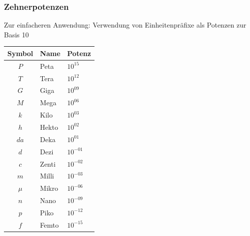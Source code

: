\begin{frame}
    \frametitle{Zehnerpotenzen}

    Zur einfacheren Anwendung: Verwendung von Einheitenpräfixe als Potenzen zur Basis 10

    \begin{center}
    \footnotesize

    \begin{tabular}{|c|l|l|}\hline
        \textbf{Symbol} & \textbf{Name} & \textbf{Potenz} \\ \hline \hline
        $P$   & Peta  & $10^{15}$  \\ \hline
        $T$   & Tera  & $10^{12}$  \\ \hline
        $G$   & Giga  & $10^{09}$  \\ \hline
        $M$   & Mega  & $10^{06}$  \\ \hline
        $k$   & Kilo  & $10^{03}$  \\ \hline
        $h$   & Hekto & $10^{02}$  \\ \hline
        $da$  & Deka  & $10^{01}$  \\ \hline
        $d$   & Dezi  & $10^{-01}$ \\ \hline
        $c$   & Zenti & $10^{-02}$ \\ \hline
        $m$   & Milli & $10^{-03}$ \\ \hline
        $\mu$ & Mikro & $10^{-06}$ \\ \hline
        $n$   & Nano  & $10^{-09}$ \\ \hline
        $p$   & Piko  & $10^{-12}$ \\ \hline
        $f$   & Femto & $10^{-15}$ \\ \hline
    \end{tabular}
    \end{center}

\end{frame}

